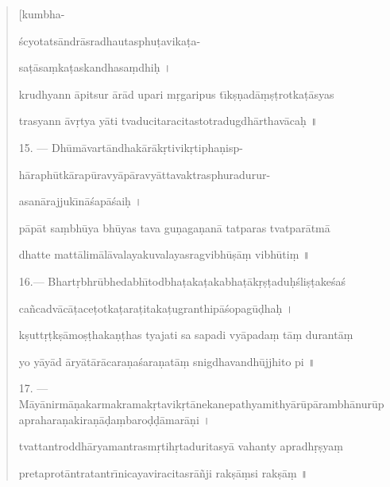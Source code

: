 \documentclass[a4paper, 11pt, oneside, french, landscape, twocolumn]{article}
\begin{document}
\begin{quotation}
\hspace*{55mm}[kumbha-

\'{s}cyotats\={a}ndr\={a}sradhautasphu\d{t}avika\d{t}a-

sa\d{t}\={a}sa\d{m}ka\d{t}askandhasa\d{m}dhi\d{h} \texthindi{।}

krudhyann \={a}pitsur \={a}r\={a}d upari m\d{r}garipus t\={\i}k\d{s}\d{n}ad\={a}\d{m}\d{s}\d{t}rotka\d{t}\={a}syas

trasyann \={a}v\d{r}tya y\={a}ti tvaducitaracitastotradugdh\={a}rthav\={a}ca\d{h} \texthindi{॥}

\bigskip

15. --- Dh\={u}m\={a}vart\={a}ndhak\={a}r\={a}k\d{r}tivik\d{r}tipha\d{n}isp-

h\={a}raph\={u}tk\={a}rap\={u}ravy\={a}p\={a}ravy\={a}ttavaktrasphuradurur-

asan\={a}rajjuk\={\i}n\={a}\'{s}ap\={a}\'{s}ai\d{h} \texthindi{।}

p\={a}p\={a}t sa\d{m}bh\={u}ya bh\={u}yas tava gu\d{n}aga\d{n}an\={a} tatparas tvatpar\={a}tm\={a}

dhatte matt\={a}lim\={a}l\={a}valayakuvalayasragvibh\={u}\d{s}\={a}\d{m} vibh\={u}ti\d{m} \texthindi{॥}

\bigskip

16.--- Bhart\d{r}bhr\={u}bhedabh\={\i}todbha\d{t}aka\d{t}akabha\d{t}\={a}k\d{r}\d{s}\d{t}adu\d{h}\'{s}li\d{s}\d{t}ake\'{s}a\'{s}

ca\~{n}cadv\={a}c\={a}\d{t}ace\d{t}otka\d{t}ara\d{t}itaka\d{t}ugranthip\={a}\'{s}opag\={u}\d{d}ha\d{h} \texthindi{।}

k\d{s}utt\d{r}\d{t}k\d{s}\={a}mo\d{s}\d{t}haka\d{n}\d{t}has tyajati sa sapadi vy\={a}pada\d{m} t\={a}\d{m} durant\={a}\d{m}

yo y\={a}y\={a}d \={a}ry\={a}t\={a}r\={a}cara\d{n}a\'{s}ara\d{n}at\={a}\d{m} snigdhavandh\={u}jjhito pi \texthindi{॥}

\bigskip

17. --- M\={a}y\={a}nirm\={a}\d{n}akarmakramak\d{r}tavik\d{r}t\={a}nekanepathyamithy\={a}r\={u}p\={a}rambh\={a}nur\={u}paprahara\d{n}akira\d{n}\={a}\d{d}a\d{m}baro\d{d}\d{d}\={a}mar\={a}\d{n}i \texthindi{।}

tvattantroddh\={a}ryamantrasm\d{r}tih\d{r}taduritasy\={a} vahanty apradh\d{r}\d{s}ya\d{m}

pretaprot\={a}ntratantr\={\i}nicayaviracitasr\={a}\~{n}ji rak\d{s}\={a}\d{m}si rak\d{s}\={a}\d{m} \texthindi{॥}

\bigskip


\end{quotation}
\end{document}

